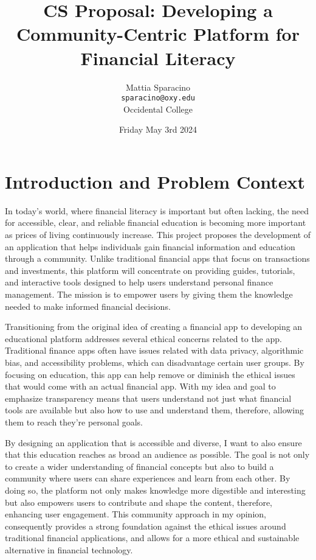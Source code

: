 \documentclass[12pt,twocolumn]{article}
\title{CS Proposal: Developing a Community-Centric Platform for Financial Literacy}
\author{Mattia Sparacino \\ \texttt{sparacino@oxy.edu} \\ Occidental College}
\date{Friday May 3rd 2024}
\begin{document}
\maketitle

\section{ Introduction and Problem Context}

In today's world, where financial literacy is important but often lacking, the need for accessible, clear, and reliable financial education is becoming more important as prices of living continuously increase. This project proposes the development of an application that helps individuals gain financial information and education through a community. Unlike traditional financial apps that focus on transactions and investments, this platform will concentrate on providing guides, tutorials, and interactive tools designed to help users understand personal finance management. The mission is to empower users by giving them the knowledge needed to make informed financial decisions.

Transitioning from the original idea of creating a financial app to developing an educational platform addresses several ethical concerns related to the app. Traditional finance apps often have issues related with data privacy, algorithmic bias, and accessibility problems, which can disadvantage certain user groups. By focusing on education, this app can help remove or diminish the ethical issues that would come with an actual financial app. With my idea and goal to emphasize transparency means that users understand not just what financial tools are available but also how to use and understand them, therefore, allowing them to reach they're personal goals. 

By designing an application that is accessible and diverse, I want to also ensure that this education reaches as broad an audience as possible. The goal is not only to create a wider understanding of financial concepts but also to build a community where users can share experiences and learn from each other. By doing so, the platform not only makes knowledge more digestible and interesting but also empowers users to contribute and shape the content, therefore, enhancing user engagement. This community approach in my opinion, consequently provides a strong foundation against the ethical issues around traditional financial applications, and allows for a more ethical and sustainable alternative in financial technology.
\end{document}
